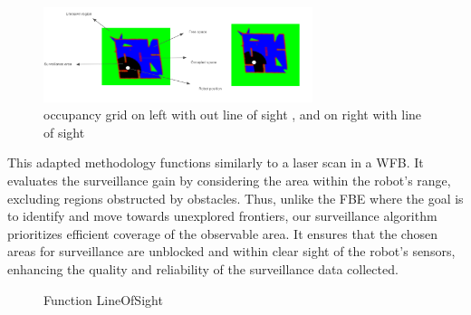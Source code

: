 \begin{figure}[h]
  \centering
  \includegraphics[width=0.7\textwidth, height=0.3\textheight]{Bilder/LOS.png}
  \caption{occupancy grid on left with out line of sight , and on right with line of sight}
  \label{fig:LOS}
\end{figure}

This adapted methodology functions similarly to a laser scan in a WFB. It evaluates the surveillance gain by considering the area within the robot's range, excluding regions obstructed by obstacles. Thus, unlike the FBE where the goal is to identify and move towards unexplored frontiers, our surveillance algorithm prioritizes efficient coverage of the observable area. It ensures that the chosen areas for surveillance are unblocked and within clear sight of the robot’s sensors, enhancing the quality and reliability of the surveillance data collected.





\begin{figure}[H]
\begin{algorithm}[H]
\DontPrintSemicolon
{}
\caption{Function LineOfSight}
\label{alg:line_of_sight}
\end{algorithm}
\end{figure}



